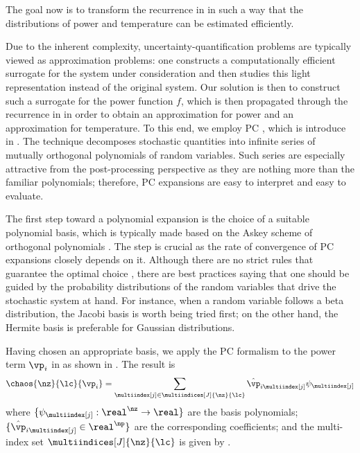 The goal now is to transform the recurrence in 
in such a way that the distributions of power and temperature can be estimated
efficiently.

Due to the inherent complexity, uncertainty-quantification problems are
typically viewed as approximation problems: one constructs a computationally
efficient surrogate for the system under consideration and then studies this
light representation instead of the original system. Our solution is then to
construct such a surrogate for the power function $f$, which is then propagated
through the recurrence in  in order to obtain an
approximation for power and an approximation for temperature. To this end, we
employ \acf{PC} \cite{xiu2010}, which is introduce in .
The technique decomposes stochastic quantities into infinite series of mutually
orthogonal polynomials of random variables. Such series are especially
attractive from the post-processing perspective as they are nothing more than
the familiar polynomials; therefore, \ac{PC} expansions are easy to interpret
and easy to evaluate.

The first step toward a polynomial expansion is the choice of a suitable
polynomial basis, which is typically made based on the Askey scheme of
orthogonal polynomials \cite{xiu2010}. The step is crucial as the rate of
convergence of \ac{PC} expansions closely depends on it. Although there are no
strict rules that guarantee the optimal choice \cite{knio2006}, there are best
practices saying that one should be guided by the probability distributions of
the random variables that drive the stochastic system at hand. For instance,
when a random variable follows a beta distribution, the Jacobi basis is worth
being tried first; on the other hand, the Hermite basis is preferable for
Gaussian distributions.

Having chosen an appropriate basis, we apply the \ac{PC} formalism to the power
term $\vp_i$ in  as shown in
. The result is
\[
  \chaos{\nz}{\lc}{\vp_i} = \sum_{\multiindex[j] \in \multiindices[J]{\nz}{\lc}} \hat{\vp}_{i \multiindex[j]} \psi_{\multiindex[j]}
\]
where $\{ \psi_{\multiindex[j]}: \real^\nz \to \real \}$ are the basis
polynomials; $\{ \hat{\vp}_{i \multiindex[j]} \in \real^\np \}$ are the
corresponding coefficients; and the multi-index set $\multiindices[J]{\nz}{\lc}$
is given by .


